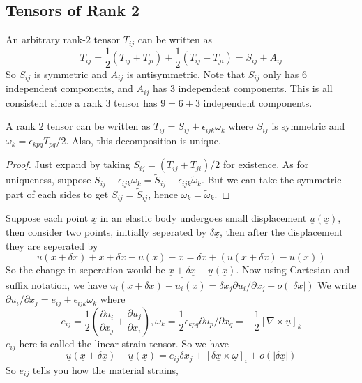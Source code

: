 \subsection{Tensors of Rank 2}
An arbitrary rank-$2$ tensor $T_{ij}$ can be written as
$$T_{ij}=\frac{1}{2}(T_{ij}+T_{ji})+\frac{1}{2}(T_{ij}-T_{ji})=S_{ij}+A_{ij}$$
So $S_{ij}$ is symmetric and $A_{ij}$ is antisymmetric.
Note that $S_{ij}$ only has $6$ independent components, and $A_{ij}$ has $3$ independent components.
This is all consistent since a rank $3$ tensor has $9=6+3$ independent components.
\begin{proposition}
    A rank $2$ tensor can be written as $T_{ij}=S_{ij}+\epsilon_{ijk}\omega_k$ where $S_{ij}$ is symmetric and $\omega_k=\epsilon_{kpq}T_{pq}/2$.
    Also, this decomposition is unique.
\end{proposition}
\begin{proof}
    Just expand by taking $S_{ij}=(T_{ij}+T_{ji})/2$ for existence.
    As for uniqueness, suppose $S_{ij}+\epsilon_{ijk}\omega_k=\tilde{S}_{ij}+\epsilon_{ijk}\tilde\omega_k$.
    But we can take the symmetric part of each sides to get $S_{ij}=\tilde{S}_{ij}$, hence $\omega_k=\tilde\omega_k$.
\end{proof}
\begin{example}
    Suppose each point $\underline{x}$ in an elastic body undergoes small displacement $\underline{u}(\underline{x})$, then consider two points, initially seperated by $\delta\underline{x}$, then after the displacement they are seperated by
    $$\underline{u}(\underline{x}+\delta\underline{x})+\underline{x}+\delta\underline{x}-\underline{u}(\underline{x})-\underline{x}=\delta\underline{x}+(\underline{u}(\underline{x}+\delta\underline{x})-\underline{u}(\underline{x}))$$
    So the change in seperation would be $\underline{\underline{x}+\delta\underline{x}}-\underline{u}(\underline{x})$.
    Now using Cartesian and suffix notation, we have $u_i(\underline{x}+\delta\underline{x})-u_i(\underline{x})=\delta x_j\partial u_i/\partial x_j+o(|\delta\underline{x}|)$
    We write $\partial u_i/\partial x_j=e_{ij}+\epsilon_{ijk}\omega_k$ where
    $$e_{ij}=\frac{1}{2}\left(\frac{\partial u_i}{\partial x_j}+\frac{\partial u_j}{\partial x_i}\right),\omega_k=\frac{1}{2}\epsilon_{kpq}\partial u_p/\partial x_q=-\frac{1}{2}[\nabla\times\underline{u}]_k$$
    $e_{ij}$ here is called the linear strain tensor.
    So we have
    $$\underline{u}(\underline{x}+\delta\underline{x})-\underline{u}(\underline{x})=e_{ij}\delta x_j+[\delta\underline{x}\times\underline{\omega}]_i+o(|\delta\underline{x}|)$$
    So $e_{ij}$ tells you how the material strains,
\end{example}
